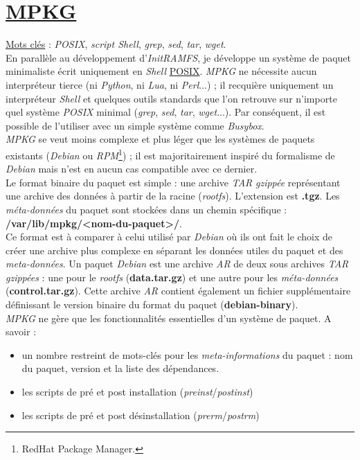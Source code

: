 \documentclass[a4paper]{article}
\begin{document}
\section{\href{https://github.com/gazoo74/mpkg/}{MPKG}}

\underline{Mots clés} : \textit{POSIX}, \textit{script Shell}, \textit{grep}, \textit{sed}, \textit{tar}, \textit{wget}.\\

En parallèle au développement d'\textit{InitRAMFS}, je développe un système de paquet minimaliste écrit uniquement en \textit{Shell} \href{https://fr.wikipedia.org/wiki/POSIX}{POSIX}. \textit{MPKG} ne nécessite aucun interpréteur tierce (ni \textit{Python}, ni \textit{Lua}, ni \textit{Perl}...) ; il recquière uniquement un interpréteur \textit{Shell} et quelques outils standards que l'on retrouve sur n'importe quel système \textit{POSIX} minimal (\textit{grep}, \textit{sed}, \textit{tar}, \textit{wget}...). Par conséquent, il est possible de l'utiliser avec un simple système comme \textit{Busybox}.\\

\textit{MPKG} se veut moins complexe et plus léger que les systèmes de paquets existants (\textit{Debian} ou \textit{RPM}\footnote{RedHat Package Manager.}) ; il est majoritairement inspiré du formalisme de \textit{Debian} mais n'est en aucun cas compatible avec ce dernier.\\

Le format binaire du paquet est simple : une archive \textit{TAR} \textit{gzippée} représentant une archive des données à partir de la racine (\textit{rootfs}). L’extension est \textbf{.tgz}. Les \textit{méta-données} du paquet sont stockées dans un chemin spécifique : \textbf{/var/lib/mpkg/<nom-du-paquet>/}.\\

Ce format est à comparer à celui utilisé par \textit{Debian} où ils ont fait le choix de créer une archive plus complexe en séparant les données utiles du paquet et des \textit{meta-données}. Un paquet \textit{Debian} est une archive \textit{AR} de deux sous archives \textit{TAR} \textit{gzippées} : une pour le \textit{rootfs} (\textbf{data.tar.gz}) et une autre pour les \textit{méta-données} (\textbf{control.tar.gz}). Cette archive \textit{AR} contient également un fichier supplémentaire définissant le version binaire du format du paquet (\textbf{debian-binary}).\\

\textit{MPKG} ne gère que les fonctionnalités essentielles d'un système de paquet. A savoir :
\begin{itemize}
\item un nombre restreint de mots-clés pour les \textit{meta-informations} du paquet : nom du paquet, version et la liste des dépendances.
\item les scripts de pré et post installation (\textit{preinst}/\textit{postinst})
\item les scripts de pré et post désinstallation (\textit{prerm}/\textit{postrm})
\end{itemize}
\end{document}

